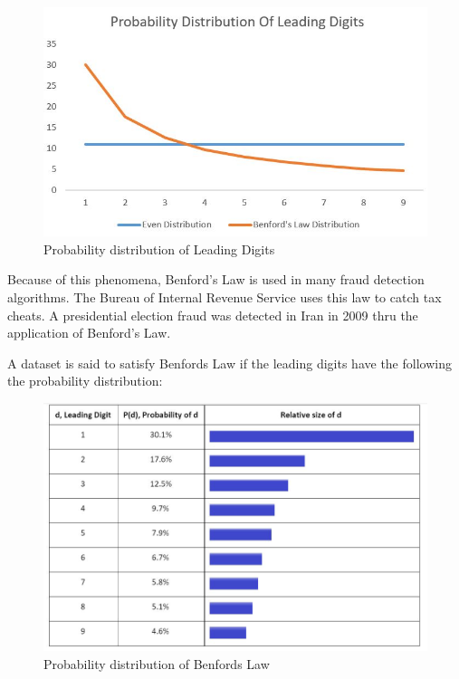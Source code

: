 \begin{figure}[!ht]
\centering\includegraphics[width=\columnwidth]{images/probability_dist.JPG}
  \caption{Probability distribution of Leading Digits}\label{f:prob-dist-lead}
\end{figure}

Because of this phenomena, Benford’s Law is used in many 
fraud detection algorithms. The Bureau of Internal Revenue 
Service uses this law to catch tax cheats. 
A presidential election fraud was detected in 
Iran in 2009 thru the application of Benford’s Law.


A dataset is said to satisfy Benfords Law if the leading 
digits have the following the probability distribution: 

\begin{figure}[!ht]
\centering\includegraphics[width=\columnwidth]{images/benfords_law.JPG}
  \caption{Probability distribution of Benfords Law}\label{f:prob-dist-ben}
\end{figure}


